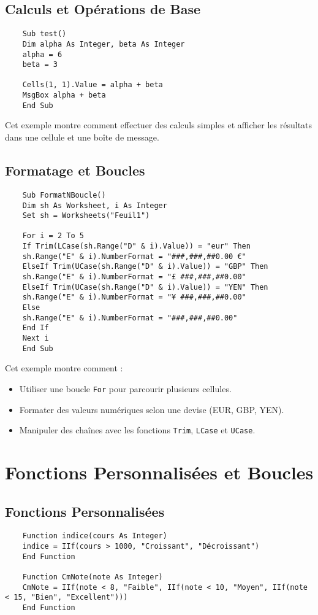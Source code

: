 \documentclass[a4paper,12pt]{report}
\begin{document}
\section{Calculs et Opérations de Base}
\begin{lstlisting}
	Sub test()
	Dim alpha As Integer, beta As Integer
	alpha = 6
	beta = 3
	
	Cells(1, 1).Value = alpha + beta
	MsgBox alpha + beta
	End Sub
\end{lstlisting}
Cet exemple montre comment effectuer des calculs simples et afficher les résultats dans une cellule et une boîte de message.
\newpage
\section{Formatage et Boucles}
\begin{lstlisting}
	Sub FormatNBoucle()
	Dim sh As Worksheet, i As Integer
	Set sh = Worksheets("Feuil1")
	
	For i = 2 To 5
	If Trim(LCase(sh.Range("D" & i).Value)) = "eur" Then
	sh.Range("E" & i).NumberFormat = "###,###,##0.00 €"
	ElseIf Trim(UCase(sh.Range("D" & i).Value)) = "GBP" Then
	sh.Range("E" & i).NumberFormat = "£ ###,###,##0.00"
	ElseIf Trim(UCase(sh.Range("D" & i).Value)) = "YEN" Then
	sh.Range("E" & i).NumberFormat = "¥ ###,###,##0.00"
	Else
	sh.Range("E" & i).NumberFormat = "###,###,##0.00"
	End If
	Next i
	End Sub
\end{lstlisting}

Cet exemple montre comment :
\begin{itemize}
	\item Utiliser une boucle \texttt{For} pour parcourir plusieurs cellules.
	\item Formater des valeurs numériques selon une devise (EUR, GBP, YEN).
	\item Manipuler des chaînes avec les fonctions \texttt{Trim}, \texttt{LCase} et \texttt{UCase}.
\end{itemize}

\chapter{Fonctions Personnalisées et Boucles}

\section{Fonctions Personnalisées}
\begin{lstlisting}
	Function indice(cours As Integer)
	indice = IIf(cours > 1000, "Croissant", "Décroissant")
	End Function
	
	Function CmNote(note As Integer)
	CmNote = IIf(note < 8, "Faible", IIf(note < 10, "Moyen", IIf(note < 15, "Bien", "Excellent")))
	End Function
\end{lstlisting}
\end{document}
